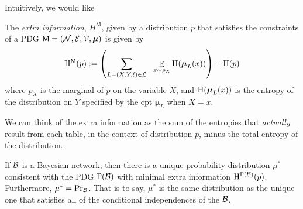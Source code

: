 \documentclass{article}
\newcommand{\bmu}{\boldsymbol{\mu}}
\newcommand{\sfM}{\mathsf M}
\newcommand{\MN}{PDG}
\numberwithin{equation}{section}
\begin{document}
	
%		
	

	Intuitively, we would like 


	\begin{defn}
		The \emph{extra information}, $H^{\sfM}$, given by a distribution $p$ that satisfies the constraints of a PDG $\sfM = \mnvars[]$ is given by
		\[ \H^{\sfM}(p) := \left(\sum_{L = (X,Y, \ell)\in \cal L} ~~\E_{x \sim p_X}  \H (\bmu_L (x)) \right) - \H(p) \] 
		where $p_X$ is the marginal of $p$ on the variable $X$, and $\H(\bmu_L(x))$ is the entropy of the distribution on $Y$ specified by the cpt $\bmu_L$ when $X = x$. 
	\end{defn}
	We can think of the extra information as the sum of the entropies that \emph{actually} result from each table, in the context of distribution $p$, minus the total entropy of the distribution.
	\begin{theorem}[restate=thmbnsRpdgs]\label{thm:bns-are-pdgs}
		If $\cal B$ is a Bayesian network, then there is a unique probability distribution $\mu^*$ consistent with the PDG $\Gamma(\cal B)$ with minimal extra information $\mathrm{H}^{\Gamma(\mathcal B)}(p)$. Furthermore, $\mu^* = \Pr_{\cal B}$. That is to say, $\mu^*$ is the same distribution as the unique one that satisfies all of the conditional independences of the $\cal B$.	
	\end{theorem}
\end{document}
